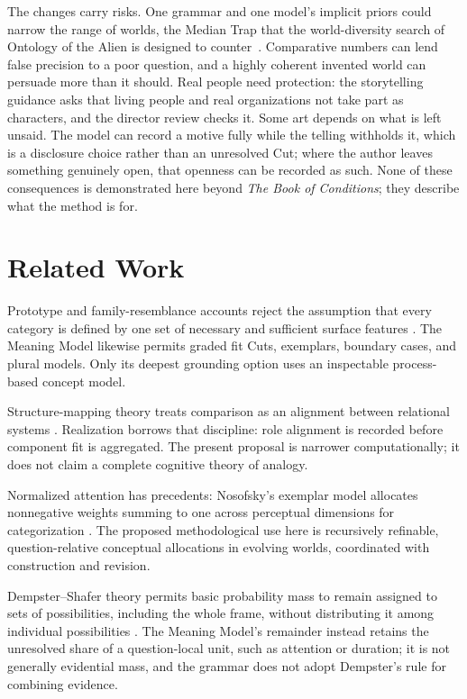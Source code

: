\documentclass[11pt,a4paper]{article}
\begin{document}
The changes carry risks. One grammar and one model's implicit priors could
narrow the range of worlds, the Median Trap that the world-diversity search of Ontology of the Alien is
designed to counter~\cite{westerbergOntology2026}. Comparative numbers can
lend false precision to a poor question, and a highly coherent invented world can
persuade more than it should. Real people need protection: the storytelling
guidance asks that living people and real organizations not take part as
characters, and the director review checks it. Some art
depends on what is left unsaid. The model can record a motive fully while the
telling withholds it, which is a disclosure choice rather than an unresolved Cut;
where the author leaves something genuinely open, that openness can be recorded as
such. None of these
consequences is demonstrated here beyond \emph{The Book of Conditions}; they describe
what the method is for.

\section{Related Work}
\label{sec:related}

Prototype and family-resemblance accounts reject the assumption that every
category is defined by one set of necessary and sufficient surface features
\cite{roschMervis1975}. The Meaning Model likewise permits graded fit Cuts,
exemplars, boundary cases, and plural models. Only its deepest grounding option
uses an inspectable process-based concept model.

Structure-mapping theory treats comparison as an alignment between relational
systems \cite{gentner1983structureMapping}. Realization borrows that discipline:
role alignment is recorded before component fit is aggregated. The present
proposal is narrower computationally; it does not claim a complete cognitive
theory of analogy.

Normalized attention has precedents: Nosofsky's exemplar model allocates
nonnegative weights summing to one across perceptual dimensions for
categorization \cite{nosofsky1986attention}. The proposed methodological use here
is recursively refinable, question-relative conceptual allocations in evolving
worlds, coordinated with construction and revision.

Dempster--Shafer theory permits basic probability mass to remain assigned to
sets of possibilities, including the whole frame, without distributing it
among individual possibilities \cite{shafer1976evidence}. The Meaning Model's
remainder instead retains the unresolved share of a question-local unit, such
as attention or duration; it is not generally evidential mass, and the grammar
does not adopt Dempster's rule for combining evidence.
\end{document}
